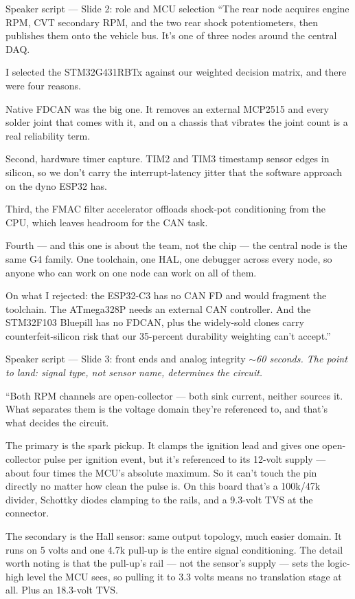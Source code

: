 \documentclass[aspectratio=169,11pt]{beamer}
\begin{document}
{\begin{frame}{Speaker script --- Slide 2: role and MCU selection}
``The rear node acquires engine RPM, CVT secondary RPM, and the two rear shock
potentiometers, then publishes them onto the vehicle bus. It's one of three nodes
around the central DAQ.

I selected the STM32G431RBTx against our weighted decision matrix, and there were
four reasons.

Native FDCAN was the big one. It removes an external MCP2515 and every solder joint
that comes with it, and on a chassis that vibrates the joint count is a real
reliability term.

Second, hardware timer capture. TIM2 and TIM3 timestamp sensor edges in silicon, so
we don't carry the interrupt-latency jitter that the software approach on the dyno
ESP32 has.

Third, the FMAC filter accelerator offloads shock-pot conditioning from the CPU,
which leaves headroom for the CAN task.

Fourth --- and this one is about the team, not the chip --- the central node is the
same G4 family. One toolchain, one HAL, one debugger across every node, so anyone
who can work on one node can work on all of them.

On what I rejected: the ESP32-C3 has no CAN FD and would fragment the toolchain.
The ATmega328P needs an external CAN controller. And the STM32F103 Bluepill has no
FDCAN, plus the widely-sold clones carry counterfeit-silicon risk that our
35-percent durability weighting can't accept.''
\end{frame}

\begin{frame}{Speaker script --- Slide 3: front ends and analog integrity}
\scriptsize
\textit{\color{dim}$\sim$60 seconds. The point to land: signal type, not sensor name,
determines the circuit.}
\medskip

``Both RPM channels are open-collector --- both sink current, neither sources it.
What separates them is the voltage domain they're referenced to, and that's what
decides the circuit.

The primary is the spark pickup. It clamps the ignition lead and gives one
open-collector pulse per ignition event, but it's referenced to its 12-volt supply
--- about four times the MCU's absolute maximum. So it can't touch the pin directly
no matter how clean the pulse is. On this board that's a 100k/47k divider, Schottky
diodes clamping to the rails, and a 9.3-volt TVS at the connector.

The secondary is the Hall sensor: same output topology, much easier domain. It runs
on 5 volts and one 4.7k pull-up is the entire signal conditioning. The detail worth
noting is that the pull-up's rail --- not the sensor's supply --- sets the logic-high
level the MCU sees, so pulling it to 3.3 volts means no translation stage at all.
Plus an 18.3-volt TVS.


\end{frame}}
\end{document}
